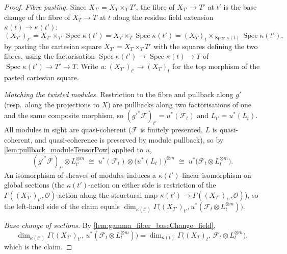 \begin{proof}
  \emph{Fibre pasting.}  Since \(X_{T'} = X_T \times_T T'\), the fibre of
  \(X_{T'} \to T'\) at \(t'\) is the base change of the fibre of
  \(X_T \to T\) at \(t\) along the residue field extension
  \(\kappa(t) \to \kappa(t')\):
  \[
    (X_{T'})_{t'}
    = X_{T'} \times_{T'} \operatorname{Spec} \kappa(t')
    = X_T \times_T \operatorname{Spec} \kappa(t')
    = (X_T)_t \times_{\operatorname{Spec} \kappa(t)}
      \operatorname{Spec} \kappa(t'),
  \]
  by pasting the cartesian square \(X_{T'} = X_T \times_T T'\) with the
  squares defining the two fibres, using the factorisation
  \(\operatorname{Spec}\kappa(t') \to \operatorname{Spec}\kappa(t) \to T\)
  of \(\operatorname{Spec}\kappa(t') \to T' \to T\).  Write
  \(u : (X_{T'})_{t'} \to (X_T)_t\) for the top morphism of the pasted
  cartesian square.

  \emph{Matching the twisted modules.}  Restriction to the fibre and
  pullback along \(g'\) (resp.\ along the projections to \(X\)) are
  pullbacks along two factorisations of one and the same composite
  morphism, so \((g'^*\mathcal{F})_{t'} = u^* (\mathcal{F}_t)\) and
  \(L_{t'} = u^* (L_t)\).  All modules in sight are quasi-coherent
  (\(\mathcal{F}\) is finitely presented, \(L\) is quasi-coherent, and
  quasi-coherence is preserved by module pullback), so by
  \cref{lem:pullback_moduleTensorPow} applied to \(u\),
  \[
    (g'^*\mathcal{F})_{t'} \otimes L_{t'}^{\otimes m}
    \;\cong\;
    u^*(\mathcal{F}_t) \otimes \bigl(u^* (L_t)\bigr)^{\otimes m}
    \;\cong\;
    u^*\bigl(\mathcal{F}_t \otimes L_t^{\otimes m}\bigr).
  \]
  An isomorphism of sheaves of modules induces a \(\kappa(t')\)-linear
  isomorphism on global sections (the \(\kappa(t')\)-action on either side
  is restriction of the \(\Gamma((X_{T'})_{t'}, \mathcal{O})\)-action along
  the structural map \(\kappa(t') \to \Gamma((X_{T'})_{t'}, \mathcal{O})\)),
  so the left-hand side of the claim equals
  \(\dim_{\kappa(t')} \Gamma\bigl((X_{T'})_{t'},
  u^*(\mathcal{F}_t \otimes L_t^{\otimes m})\bigr)\).

  \emph{Base change of sections.}  By
  \cref{lem:gamma_fiber_baseChange_field},
  \[
    \dim_{\kappa(t')} \Gamma\bigl((X_{T'})_{t'},\,
      u^*(\mathcal{F}_t \otimes L_t^{\otimes m})\bigr)
    =
    \dim_{\kappa(t)} \Gamma\bigl((X_T)_t,\,
      \mathcal{F}_t \otimes L_t^{\otimes m}\bigr),
  \]
  which is the claim.
\end{proof}

